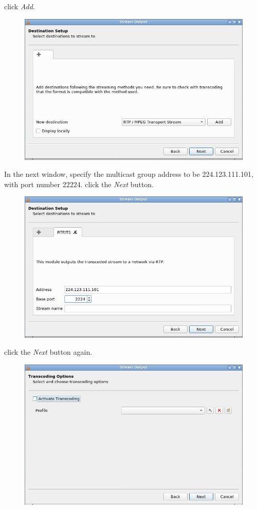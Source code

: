 \documentclass{../UTNetLab}
\begin{document}
    click \textit{Add}.
    \begin{figure}[H]
        \centering
        \includegraphics[scale=1.6]{img/stream2}
    \end{figure}
    In the next window, specify the multicast group address to be {224.123.111.101}, with port number {22224}.
    click the \textit{Next} button.
    \begin{figure}[H]
        \centering
        \includegraphics[scale=1.6]{img/stream3}
    \end{figure}
    click the \textit{Next} button again.
    \begin{figure}[H]
        \centering
        \includegraphics[scale=1.6]{img/stream4}
    \end{figure}
\end{document}
